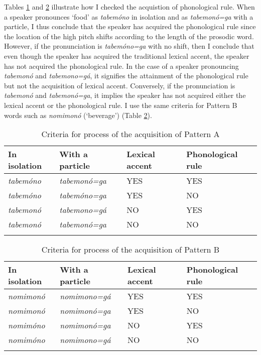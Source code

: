 \documentclass[output=paper,colorlinks,citecolor=brown]{langscibook}
\begin{document}
Tables \ref{tab:tabenomi} and \ref{tab:nominomi} illustrate how I checked the acquistion of phonological rule. When a speaker pronounces `food' as \emph{tabemóno} in isolation and as \emph{tabemonó=ga} with a particle, I thus conclude that the speaker has acquired the phonological rule since the location of the high pitch shifts according to the length of the prosodic word. However, if the pronunciation is \emph{tabemóno=ga} with no shift, then I conclude that even though the speaker has acquired the traditional lexical accent, the speaker has not acquired the phonological rule. In the case of a speaker pronouncing \emph{tabemonó} and \emph{tabemono=gá}, it signifies the attainment of the phonological rule but not the acquisition of lexical accent. Conversely, if the pronunciation is \emph{tabemonó} and \emph{tabemonó=ga}, it implies the speaker has not acquired either the lexical accent or the phonological rule. I use the same criteria for Pattern B words such as \emph{nomimonó} (`beverage') (Table \ref{tab:nominomi}).



\begin{table}[p]
\centering
\caption{Criteria for process of the acquisition of Pattern A}
\label{tab:tabenomi}
\begin{tabular}{llll}
\lsptoprule
In isolation & With a particle & Lexical accent & Phonological rule \\\midrule
\emph{tabemóno} & \emph{tabemonó=ga} & YES & YES \\
\emph{tabemóno} & \emph{tabemóno=ga} & YES & NO \\
\emph{tabemonó} & \emph{tabemono=gá} & NO & YES \\
\emph{tabemonó} & \emph{tabemonó=ga} & NO & NO \\
\lspbottomrule
\end{tabular}
\end{table}

\begin{table}[p]
\centering
\caption{Criteria for process of the acquisition of Pattern B}
\label{tab:nominomi}
\begin{tabular}{llll}
\lsptoprule
In isolation & With a particle & Lexical accent & Phonological rule \\\midrule
\emph{nomimonó} & \emph{nomimono=gá} & YES & YES \\
\emph{nomimonó} & \emph{nomimonó=ga} & YES & NO \\
\emph{nomimóno} & \emph{nomimonó=ga} & NO & YES \\
\emph{nomimóno} & \emph{nomimono=gá} & NO & NO \\
\lspbottomrule
\end{tabular}
\end{table}
\end{document}
